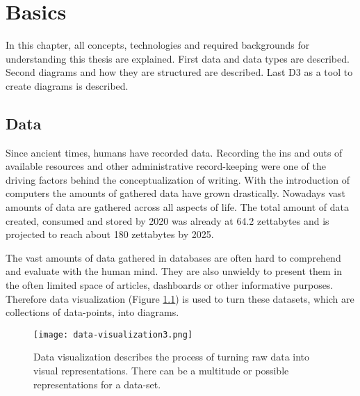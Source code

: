 \chapter{Basics}

In this chapter, all concepts, technologies and required backgrounds for understanding this thesis are explained. First data and data types are described. Second diagrams and how they are structured are described. Last D3 as a tool to create diagrams is described.


\section{Data}

Since ancient times, humans have recorded data. Recording the ins and outs of available resources and other administrative record-keeping were one of the driving factors behind the conceptualization of writing\cite{senner1991origins}.
With the introduction of computers the amounts of gathered data have grown drastically. Nowadays vast amounts of data are gathered across all aspects of life. The total amount of data created, consumed and stored by 2020 was already at 64.2 zettabytes and is projected to reach about 180 zettabytes by 2025\cite{statista_2022}.

The vast amounts of data gathered in databases are often hard to comprehend and evaluate with the human mind. They are also unwieldy to present them in the often limited space of articles, dashboards or other informative purposes. Therefore data visualization (Figure \ref{fig:data-visualization}) is used to turn these datasets, which are collections of data-points, into diagrams.

\begin{figure}
    \texttt{[image: data-visualization3.png]}
    \captionsetup{width=0.9\textwidth}
    \caption[data-visualization]{Data visualization describes the process of turning raw data into visual representations. There can be a multitude or possible representations for a data-set.}
    \label{fig:data-visualization}
\end{figure}

